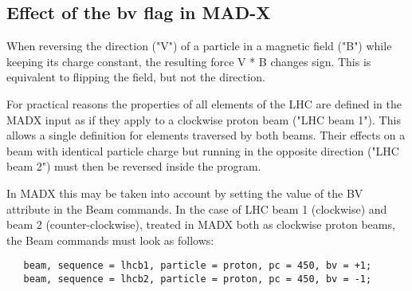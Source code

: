 
\subsection{Effect of the bv flag in MAD-X}

When reversing the direction ("V") of a particle in a magnetic field
("B") while keeping its charge constant, the resulting force V * B
changes sign. This is equivalent to flipping the field, but not the
direction.  

For practical reasons the properties of all elements of the LHC are
defined in the MADX input as if they apply to a clockwise proton beam
("LHC beam 1"). This allows a single definition for elements traversed
by both beams. Their effects on a beam with identical particle charge
but running in the opposite direction ("LHC beam 2") must then be
reversed inside the program.  

In MADX this may be taken into account by setting the value of the BV
attribute in the Beam commands. In the case of LHC beam 1 (clockwise)
and beam 2 (counter-clockwise), treated in MADX both as clockwise proton
beams, the Beam commands must look as follows: 

\begin{verbatim}
   beam, sequence = lhcb1, particle = proton, pc = 450, bv = +1;
   beam, sequence = lhcb2, particle = proton, pc = 450, bv = -1;
\end{verbatim}

